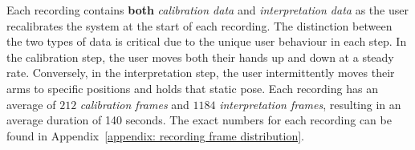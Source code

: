 
Each recording contains \textbf{both} \textit{calibration data} and \textit{interpretation data} as the user recalibrates the system at the start of each recording.
The distinction between the two types of data is critical due to the unique user behaviour in each step.
In the calibration step, the user moves both their hands up and down at a steady rate.
Conversely, in the interpretation step, the user intermittently moves their arms to specific positions and holds that static pose.
Each recording has an average of $212$ \textit{calibration frames} and $1184$ \textit{interpretation frames}, resulting in an average duration of 140 seconds.
The exact numbers for each recording can be found in Appendix~\ref{appendix: recording frame distribution}.






